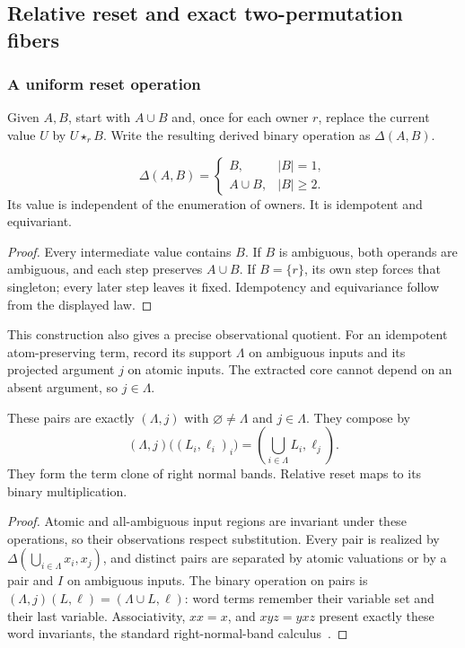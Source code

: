 \subsection{Relative reset and exact two-permutation fibers}

\subsubsection{A uniform reset operation}

Given $A,B$, start with $A\cup B$ and, once for each owner $r$, replace
the current value $U$ by $U\star_r B$. Write the resulting derived
binary operation as $\Delta(A,B)$.

\begin{lemma}\label{gen:lem:relative}
\[
 \Delta(A,B)=
 \begin{cases}B,&|B|=1,\\A\cup B,&|B|\geq2.\end{cases}
\]
Its value is independent of the enumeration of owners. It is
idempotent and equivariant.
\end{lemma}
\begin{proof}
Every intermediate value contains $B$. If $B$ is ambiguous, both
operands are ambiguous, and each step preserves $A\cup B$. If
$B=\{r\}$, its own step forces that singleton; every later step leaves
it fixed. Idempotency and equivariance follow from the displayed law.
\end{proof}

This construction also gives a precise observational quotient.
For an idempotent atom-preserving term, record its support $\Lambda$ on
ambiguous inputs and its projected argument $j$ on atomic inputs.
The extracted core cannot depend on an absent argument, so $j\in \Lambda$.

\begin{proposition}\label{gen:prop:pointed}
These pairs are exactly $(\Lambda,j)$ with $\varnothing\ne \Lambda$ and $j\in \Lambda$.
They compose by
\[
 (\Lambda,j)\bigl((L_i,\ell_i)_i\bigr)
   =\left(\bigcup_{i\in \Lambda}L_i,\ell_j\right).
\]
They form the term clone of right normal bands. Relative reset maps to
its binary multiplication.
\end{proposition}
\begin{proof}
Atomic and all-ambiguous input regions are invariant under these
operations, so their observations respect substitution. Every pair is
realized by $\Delta(\bigcup_{i\in \Lambda}x_i,x_j)$, and distinct pairs are
separated by atomic valuations or by a pair and $I$ on ambiguous inputs.
The binary operation on pairs is $(\Lambda,j)(L,\ell)=(\Lambda\cup L,\ell)$:
word terms remember their variable set and their last variable.
Associativity, $xx=x$, and $xyz=yxz$ present exactly these word
invariants, the standard right-normal-band
calculus~\cite[Section~8]{RomanowskaSmith1989}.
\end{proof}

